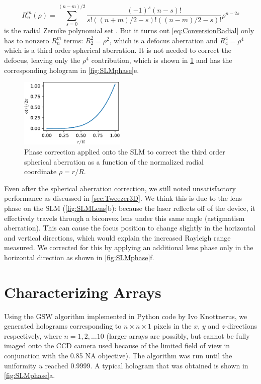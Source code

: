\begin{equation}\label{eq:ZernikeRadial}
    R_{n}^{m}(\rho)=
    \sum_{s=0}^{(n-m) / 2}
    \frac{(-1)^{s}(n-s) !}{s !\left((n+m)/2-s\right) !\left((n-m)/2-s\right) !} \rho^{n-2 s}
\end{equation}
is the radial Zernike polynomial set \cite{Mahajan94}. But it turns out \cref{eq:ConversionRadial} only has to nonzero $R_n^m$ terms: $R_2^2 = \rho^2$, which is a defocus aberration and $R_4^4 =\rho^4$ which is a third order spherical aberration. It is not needed to correct the defocus, leaving only the $\rho^4$ contribution, which is shown in \cref{fig:AberrationTerm} and has the corresponding hologram in \cref{fig:SLMphase}e.

\begin{figure}
    \centering
    \includegraphics[width=0.45\textwidth]{figures/SphericalAberrationTerm.pdf}
    \caption{Phase correction applied onto the SLM to correct the third order spherical aberration as a function of the normalized radial coordinate $\rho=r/R$.}
    \label{fig:AberrationTerm}
\end{figure}

Even after the spherical aberration correction, we still noted unsatisfactory performance as discussed in \cref{sec:Tweezer3D}. 
We think this is due to the lens phase on the SLM (\cref{fig:SLMLens}b): because the laser reflects off of the device, it effectively travels through a biconvex lens under this same angle (astigmatism aberration). 
This can cause the focus position to change slightly in the horizontal and vertical directions, which would explain the increased Rayleigh range measured. 
We corrected for this by applying an additional lens phase only in the horizontal direction as shown in \cref{fig:SLMphase}f.


\section{Characterizing Arrays}\label{sec:ArraysResults}

Using the \ac{GSW} algorithm implemented in Python code by Ivo Knottnerus, we generated holograms corresponding to $n \times n \times 1$ pixels in the $x$, $y$ and $z$-directions respectively, where $n = 1,2,\ldots 10$ (larger arrays are possibly, but cannot be fully imaged onto the CCD camera used because of the limited field of view in conjunction with the 0.85 NA objective). 
The algorithm was run until the uniformity $u$ reached 0.9999. 
A typical hologram that was obtained is shown in \cref{fig:SLMphase}a.

